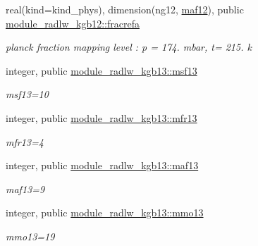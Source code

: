 \begin{DoxyCompactItemize}
\mbox{\label{group__module__radlw__kgbnn_ga58ff4f54c11eb12f7ab5157823981b16}} 
real(kind=kind\+\_\+phys), dimension(ng12, \hyperlink{group__module__radlw__kgbnn_ga9d7c05182e21605108bd65f47bb5569c}{maf12}), public \hyperlink{group__module__radlw__kgbnn_ga58ff4f54c11eb12f7ab5157823981b16}{module\+\_\+radlw\+\_\+kgb12\+::fracrefa}
\begin{DoxyCompactList}\small\item\em planck fraction mapping level \+: p = 174. mbar, t= 215. k \end{DoxyCompactList}\item 
\mbox{\label{group__module__radlw__kgbnn_ga7f88590d2a9fc392b04e89fd3d4bf2bf}} 
integer, public \hyperlink{group__module__radlw__kgbnn_ga7f88590d2a9fc392b04e89fd3d4bf2bf}{module\+\_\+radlw\+\_\+kgb13\+::msf13}
\begin{DoxyCompactList}\small\item\em msf13=10 \end{DoxyCompactList}\item 
\mbox{\label{group__module__radlw__kgbnn_ga158782c955af9f50aaefea2d49af97ce}} 
integer, public \hyperlink{group__module__radlw__kgbnn_ga158782c955af9f50aaefea2d49af97ce}{module\+\_\+radlw\+\_\+kgb13\+::mfr13}
\begin{DoxyCompactList}\small\item\em mfr13=4 \end{DoxyCompactList}\item 
\mbox{\label{group__module__radlw__kgbnn_ga1ddc025df872b12194b8c6344cc0204e}} 
integer, public \hyperlink{group__module__radlw__kgbnn_ga1ddc025df872b12194b8c6344cc0204e}{module\+\_\+radlw\+\_\+kgb13\+::maf13}
\begin{DoxyCompactList}\small\item\em maf13=9 \end{DoxyCompactList}\item 
\mbox{\label{group__module__radlw__kgbnn_gae513ce55829a57a0dbda77f570e4a619}} 
integer, public \hyperlink{group__module__radlw__kgbnn_gae513ce55829a57a0dbda77f570e4a619}{module\+\_\+radlw\+\_\+kgb13\+::mmo13}
\begin{DoxyCompactList}\small\item\em mmo13=19 \end{DoxyCompactList}\item 

\end{DoxyCompactItemize}
